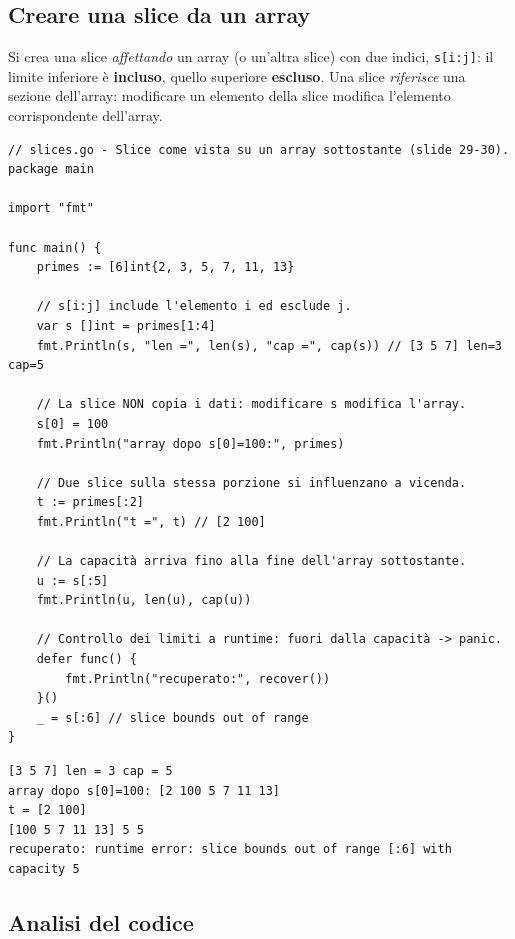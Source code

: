 \documentclass[11pt,a4paper]{report}
\newcommand{\cod}[1]{\texttt{#1}}
\begin{document}
\subsection{Creare una slice da un array}

Si crea una slice \emph{affettando} un array (o un'altra slice) con due indici,
\cod{s[i:j]}: il limite inferiore è \textbf{incluso}, quello superiore
\textbf{escluso}. Una slice \emph{riferisce} una sezione dell'array: modificare un
elemento della slice modifica l'elemento corrispondente dell'array.

\begin{lstlisting}[style=gocode,caption={\texttt{04\_data\_structures/slices.go}}]
// slices.go - Slice come vista su un array sottostante (slide 29-30).
package main

import "fmt"

func main() {
	primes := [6]int{2, 3, 5, 7, 11, 13}

	// s[i:j] include l'elemento i ed esclude j.
	var s []int = primes[1:4]
	fmt.Println(s, "len =", len(s), "cap =", cap(s)) // [3 5 7] len=3 cap=5

	// La slice NON copia i dati: modificare s modifica l'array.
	s[0] = 100
	fmt.Println("array dopo s[0]=100:", primes)

	// Due slice sulla stessa porzione si influenzano a vicenda.
	t := primes[:2]
	fmt.Println("t =", t) // [2 100]

	// La capacità arriva fino alla fine dell'array sottostante.
	u := s[:5]
	fmt.Println(u, len(u), cap(u))

	// Controllo dei limiti a runtime: fuori dalla capacità -> panic.
	defer func() {
		fmt.Println("recuperato:", recover())
	}()
	_ = s[:6] // slice bounds out of range
}
\end{lstlisting}
\begin{lstlisting}[style=output]
[3 5 7] len = 3 cap = 5
array dopo s[0]=100: [2 100 5 7 11 13]
t = [2 100]
[100 5 7 11 13] 5 5
recuperato: runtime error: slice bounds out of range [:6] with capacity 5
\end{lstlisting}

\subsection{Analisi del codice}
\end{document}
